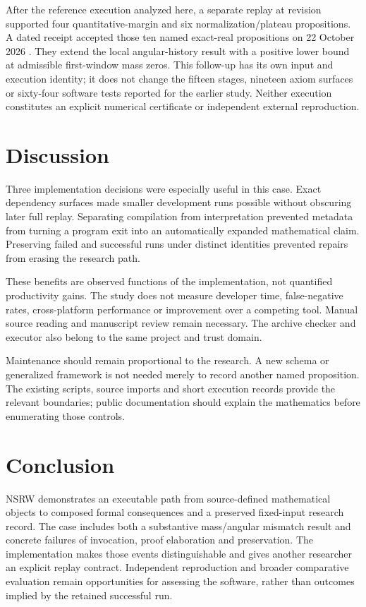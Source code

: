 \documentclass[11pt,a4paper]{article}
\begin{document}
After the reference execution analyzed here, a separate replay at revision  supported four quantitative-margin and six normalization/plateau propositions. A dated receipt accepted those ten named exact-real propositions on 22 October 2026 \cite{ref12}. They extend the local angular-history result with a positive lower bound at admissible first-window mass zeros. This follow-up has its own input and execution identity; it does not change the fifteen stages, nineteen axiom surfaces or sixty-four software tests reported for the earlier study. Neither execution constitutes an explicit numerical certificate or independent external reproduction.

\section{Discussion}

Three implementation decisions were especially useful in this case. Exact dependency surfaces made smaller development runs possible without obscuring later full replay. Separating compilation from interpretation prevented metadata from turning a program exit into an automatically expanded mathematical claim. Preserving failed and successful runs under distinct identities prevented repairs from erasing the research path.

These benefits are observed functions of the implementation, not quantified productivity gains. The study does not measure developer time, false-negative rates, cross-platform performance or improvement over a competing tool. Manual source reading and manuscript review remain necessary. The archive checker and executor also belong to the same project and trust domain.

Maintenance should remain proportional to the research. A new schema or generalized framework is not needed merely to record another named proposition. The existing scripts, source imports and short execution records provide the relevant boundaries; public documentation should explain the mathematics before enumerating those controls.

\section{Conclusion}

NSRW demonstrates an executable path from source-defined mathematical objects to composed formal consequences and a preserved fixed-input research record. The case includes both a substantive mass/angular mismatch result and concrete failures of invocation, proof elaboration and preservation. The implementation makes those events distinguishable and gives another researcher an explicit replay contract. Independent reproduction and broader comparative evaluation remain opportunities for assessing the software, rather than outcomes implied by the retained successful run.
\end{document}
